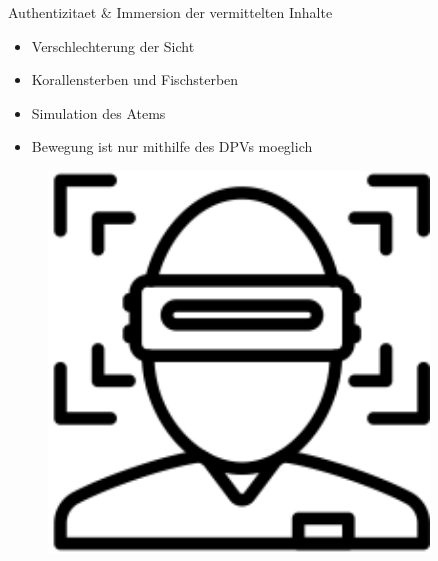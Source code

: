 \documentclass{beamer}
\begin{document}
\begin{frame}{Authentizitaet \& Immersion der vermittelten Inhalte}
\begin{minipage}[c]{0.72\textwidth}
\begin{itemize}
\item Verschlechterung der Sicht
\item Korallensterben und Fischsterben
\item Simulation des Atems
\item Bewegung ist nur mithilfe des DPVs moeglich
\end{itemize}
\end{minipage}
\hfill
\begin{minipage}[c]{0.25\textwidth}
\begin{figure}
\centering
\includegraphics[width=0.9\textwidth, keepaspectratio]{img/immersion}
\caption{\cite{c}}
\end{figure}
\end{minipage}
\end{frame}
\end{document}
